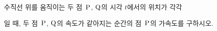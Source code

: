 수직선 위를 움직이는 두 점~$\mathrm{P}$, $\mathrm{Q}$의 시각 $t$에서의 위치가 각각 \par\smallskip{}\par\smallskip\noindent 일 때, 두 점~$\mathrm{P}$, $\mathrm{Q}$의 속도가 같아지는 순간의 점~$\mathrm{P}$의 가속도를 구하시오.
